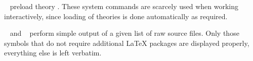 \begin{isabellebody}
\begin{isamarkuptext}
\begin{descr}
  \item [\mbox{\isa{\isacommand{use{\isacharunderscore}thy}}}~\isa{A}] preload theory .
  These system commands are scarcely used when working interactively,
  since loading of theories is done automatically as required.

  \item [\mbox{\isa{\isacommand{display{\isacharunderscore}drafts}}}~\isa{paths} and \mbox{\isa{\isacommand{print{\isacharunderscore}drafts}}}~\isa{paths}] perform simple output of a given list
  of raw source files.  Only those symbols that do not require
  additional {\LaTeX} packages are displayed properly, everything else
  is left verbatim.

  \end{descr}%
\end{isamarkuptext}%
\isamarkuptrue%
%
\isadelimtheory
%
\endisadelimtheory
%
\isatagtheory
{}\isamarkupfalse%
%
\endisatagtheory
{\isafoldtheory}%
%
\isadelimtheory
%
\endisadelimtheory
\isanewline
\end{isabellebody}%
